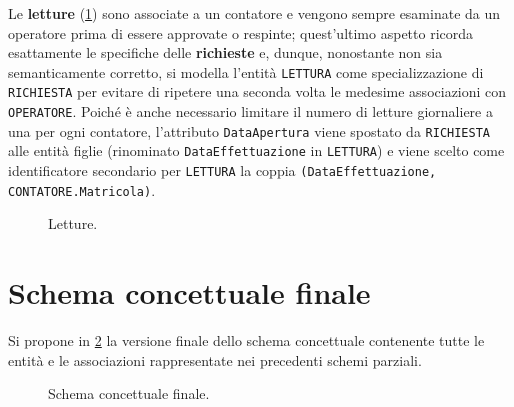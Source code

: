 \documentclass[a4paper,12pt]{report}
\begin{document}
Le \textbf{letture} (\cref{fig:measurements}) sono associate a un contatore e vengono sempre esaminate da un operatore prima di essere approvate o respinte; quest'ultimo aspetto ricorda esattamente le specifiche delle \textbf{richieste} e, dunque, nonostante non sia semanticamente corretto, si modella l'entità \texttt{LETTURA} come specializzazione di \texttt{RICHIESTA} per evitare di ripetere una seconda volta le medesime associazioni con \texttt{OPERATORE}. Poiché è anche necessario limitare il numero di letture giornaliere a una per ogni contatore, l'attributo \texttt{DataApertura} viene spostato da \texttt{RICHIESTA} alle entità figlie (rinominato \texttt{DataEffettuazione} in \texttt{LETTURA}) e viene scelto come identificatore secondario per \texttt{LETTURA} la coppia \texttt{(DataEffettuazione, CONTATORE.Matricola)}.

\begin{figure}[H]
\centering{}
\caption{Letture.}
\label{fig:measurements}
\end{figure}

\section{Schema concettuale finale}
Si propone in \cref{fig:full-schema} la versione finale dello schema concettuale contenente tutte le entità e le associazioni rappresentate nei precedenti schemi parziali.

\begin{figure}
\centering{}
\caption{Schema concettuale finale.}
\label{fig:full-schema}
\end{figure}
\end{document}
